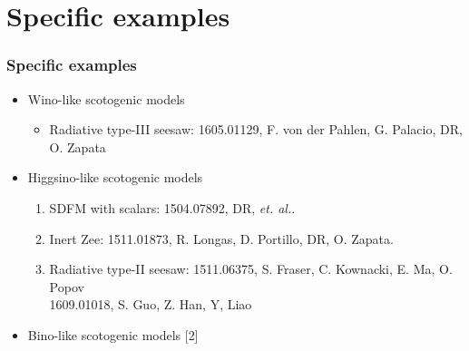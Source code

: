 \documentclass[%
xcolor=dvipsnames,table%
]{beamer}
\begin{document}
\section{Specific examples}



\begin{frame}
  \frametitle{Specific examples}
  
  \begin{itemize}
    \item Wino-like scotogenic models
    \begin{itemize}
    \item \alert{Radiative type-III seesaw}: \tiny{1605.01129, 	
 F. von der Pahlen, G. Palacio, DR, O. Zapata}
    \end{itemize}
    \item Higgsino-like scotogenic models
      \begin{enumerate}
      \item SDFM with scalars: {\tiny 1504.07892, DR, \textit{et. al.}.}
      \item Inert Zee: {\tiny 1511.01873, R. Longas, D. Portillo, DR, O. Zapata.}
      \item \alert{Radiative type-II seesaw}: {\tiny 1511.06375, S. Fraser, C. Kownacki, E. Ma, O. Popov}\\
       \hspace{4.2cm}     {\tiny 1609.01018,   S. Guo, Z. Han, Y, Liao }
      \end{enumerate}
    \item Bino-like scotogenic models [2]
  \end{itemize}


\end{frame}
\end{document}

